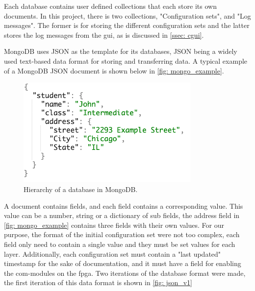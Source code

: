 \documentclass[main.tex]{subfiles}
\begin{document}
Each database contains user defined collections that each store its own documents. In this project, there is two collections, "Configuration sets", and "Log messages". The former is for storing the different configuration sets and the latter stores the log messages from the \gls{gui}, as is discussed in \autoref{ssec: cgui}.

MongoDB uses JSON as the template for its databases, JSON being a widely used text-based data format for storing and transferring data. A typical example of a MongoDB JSON document is shown below in \autoref{fig: mongo_example}.

\begin{figure}[!ht]
    \centering
    \includegraphics[width=9cm, scale=1.5]{images/mongodb_document_example.png}
    \caption{Hierarchy of a database in MongoDB.}
    \label{fig: mongo_example}
\end{figure}
\FloatBarrier

A document contains fields, and each field contains a corresponding value. This value can be a number, string or a dictionary of sub fields, the address field in \autoref{fig: mongo_example} contains three fields with their own values.
For our purpose, the format of the initial configuration set were not too complex, each field only need to contain a single value and they must be set values for each layer. Additionally, each configuration set must contain a "last updated" timestamp for the sake of documentation, and it must have a field for enabling the com-modules on the \gls{fpga}. Two iterations of the database format were made, the first iteration of this data format is shown in \autoref{fig: json_v1}
\end{document}
